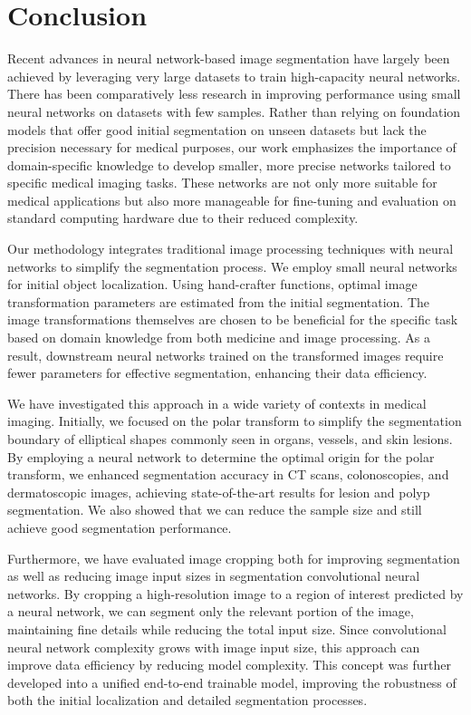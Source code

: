 \chapter{Conclusion}
\label{chap:conclusion}

Recent advances in neural network-based image segmentation have largely been achieved by leveraging very large datasets to train high-capacity neural networks. There has been comparatively less research in improving performance using small neural networks on datasets with few samples. Rather than relying on foundation models that offer good initial segmentation on unseen datasets but lack the precision necessary for medical purposes, our work emphasizes the importance of domain-specific knowledge to develop smaller, more precise networks tailored to specific medical imaging tasks. These networks are not only more suitable for medical applications but also more manageable for fine-tuning and evaluation on standard computing hardware due to their reduced complexity.

Our methodology integrates traditional image processing techniques with neural networks to simplify the segmentation process. We employ small neural networks for initial object localization. Using hand-crafter functions, optimal image transformation parameters are estimated from the initial segmentation. The image transformations themselves are chosen to be beneficial for the specific task based on domain knowledge from both medicine and image processing. As a result, downstream neural networks trained on the transformed images require fewer parameters for effective segmentation, enhancing their data efficiency.

We have investigated this approach in a wide variety of contexts in medical imaging. Initially, we focused on the polar transform to simplify the segmentation boundary of elliptical shapes commonly seen in organs, vessels, and skin lesions. By employing a neural network to determine the optimal origin for the polar transform, we enhanced segmentation accuracy in CT scans, colonoscopies, and dermatoscopic images, achieving state-of-the-art results for lesion and polyp segmentation. We also showed that we can reduce the sample size and still achieve good segmentation performance.

Furthermore, we have evaluated image cropping both for improving segmentation as well as reducing image input sizes in segmentation convolutional neural networks. By cropping a high-resolution image to a region of interest predicted by a neural network, we can segment only the relevant portion of the image, maintaining fine details while reducing the total input size. Since convolutional neural network complexity grows with image input size, this approach can improve data efficiency by reducing model complexity. This concept was further developed into a unified end-to-end trainable model, improving the robustness of both the initial localization and detailed segmentation processes.

